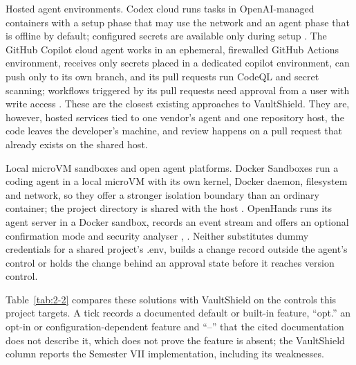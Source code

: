 \documentclass[12pt,a4paper,oneside]{report}
\begin{document}
Hosted agent environments. Codex cloud runs tasks in OpenAI-managed containers with a setup phase that may use the network and an agent phase that is offline by default; configured secrets are available only during setup \cite{ref18}. The GitHub Copilot cloud agent works in an ephemeral, firewalled GitHub Actions environment, receives only secrets placed in a dedicated copilot environment, can push only to its own branch, and its pull requests run CodeQL and secret scanning; workflows triggered by its pull requests need approval from a user with write access \cite{ref19}. These are the closest existing approaches to VaultShield. They are, however, hosted services tied to one vendor's agent and one repository host, the code leaves the developer's machine, and review happens on a pull request that already exists on the shared host.

Local microVM sandboxes and open agent platforms. Docker Sandboxes run a coding agent in a local microVM with its own kernel, Docker daemon, filesystem and network, so they offer a stronger isolation boundary than an ordinary container; the project directory is shared with the host \cite{ref20}. OpenHands runs its agent server in a Docker sandbox, records an event stream and offers an optional confirmation mode and security analyser \cite{ref4}, \cite{ref21}. Neither substitutes dummy credentials for a shared project's .env, builds a change record outside the agent's control or holds the change behind an approval state before it reaches version control.

Table~\ref{tab:2-2} compares these solutions with VaultShield on the controls this project targets. A tick records a documented default or built-in feature, ``opt.'' an opt-in or configuration-dependent feature and ``--'' that the cited documentation does not describe it, which does not prove the feature is absent; the VaultShield column reports the Semester VII implementation, including its weaknesses.
\end{document}
